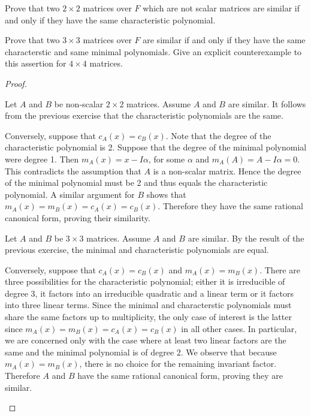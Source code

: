 \documentclass[10pt]{amsart}
\begin{document}
\begin{thm}
  \label{Ex2}
  \begin{alphaenum}
  \item
    Prove that two $2 \times 2$ matrices over $F$ which are not scalar matrices are similar if and only if they have the same characteristic polynomial.
  \item
    Prove that two $3 \times 3$ matrices over $F$ are similar if and only if they have the same characterstic and same minimal polynomials.
    Give an explicit counterexample to this assertion for $4 \times 4$ matrices.
  \end{alphaenum}
  \begin{proof}
    \begin{alphaenum}
    \item
      Let $A$ and $B$ be non-scalar $2 \times 2$ matrices.
      Assume $A$ and $B$ are similar.
      It follows from the previous exercise that the characteristic polynomials are the same.
      
      Conversely, suppose that $c_A(x) = c_B(x)$.
      Note that the degree of the characteristic polynomial is 2.
      Suppose that the degree of the minimal polynomial were degree 1.
      Then $m_A(x) = x - I\alpha$, for some $\alpha$ and $m_A(A) = A - I\alpha = 0$.
      This contradicts the assumption that $A$ is a non-scalar matrix.
      Hence the degree of the minimal polynomial must be 2 and thus equals the characteristic polynomial.
      A similar argument for $B$ shows that $m_A(x) = m_B(x) = c_A(x) = c_B(x)$.
      Therefore they have the same rational canonical form, proving their similarity.
    \item
      Let $A$ and $B$ be $3 \times 3$ matrices.
      Assume $A$ and $B$ are similar.
      By the result of the previous exercise, the minimal and characteristic polynomials are equal.
      
      Conversely, suppose that $c_A(x) = c_B(x)$ and $m_A(x) = m_B(x)$.
      There are three possibilities for the characteristic polynomial; either it is irreducible of degree 3, it factors into an irreducible quadratic and a linear term or it factors into three linear terms.
      Since the minimal and characterstic polynomials must share the same factors up to multiplicity, the only case of interest is the latter since $m_A(x) = m_B(x) = c_A(x) = c_B(x)$ in all other cases.
      In particular, we are concerned only with the case where at least two linear factors are the same and the minimal polynomial is of degree 2.
      We observe that because  $m_A(x) = m_B(x)$, there is no choice for the remaining invariant factor.
      Therefore $A$ and $B$ have the same rational canonical form, proving they are similar.
    \end{alphaenum}
  \end{proof}
\end{thm}
\end{document}

